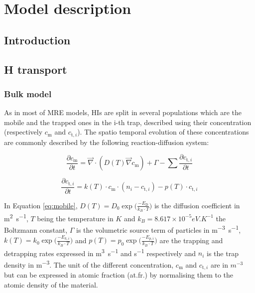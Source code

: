 \chapter{Model description}
\label{Chapter2} %
\section{Introduction}
\section{H transport} \label{description_H_transport_model}
\subsection{Bulk model}
As in most of MRE models, HIs are split in several populations which are the mobile and the trapped ones in the i-th trap, described using their concentration (respectively $c_\mathrm{m}$ and $c_{\mathrm{t},i}$).
The spatio temporal evolution of these concentrations are commonly described by the following reaction-diffusion system:

\begin{equation}
    \frac{\partial c_\mathrm{m}}{\partial t}=\vec{\nabla} \cdot\left(D(T) \vec{\nabla}c_\mathrm{m}\right)+\Gamma-\sum \frac{\partial c_{\mathrm{t}, i}}{\partial t}
    \label{eq:mobile}
\end{equation}

\begin{equation}
    \frac{\partial c_{\mathrm{t}, i}}{\partial t}=k(T) \cdot c_\mathrm{m} \cdot\left(n_{i}-c_{\mathrm{t}, i}\right)-p(T) \cdot c_{\mathrm{t}, i}
    \label{eq:trapped}
\end{equation}

In Equation \ref{eq:mobile}, ${D(T)=D_0 \exp\big(\frac{-E_\mathrm{D}}{k_B \cdot T}\big)}$ is the diffusion coefficient in \si{m^2.s^{-1}}, $T$ being the temperature in $\si{K}$ and ${k_B = 8.617 \times 10^{-5} \si{eV.K^{-1}}}$ the Boltzmann constant, $\Gamma$ is the volumetric source term of particles in \si{m^{-3}.s^{-1}}, $k(T)=k_0\exp{\big(\frac{-E_{k, i}}{k_B \cdot T}\big)}$ and $p(T)=p_0\exp{\big(\frac{-E_{p, i}}{k_B \cdot T}\big)}$ are the trapping and detrapping rates expressed in \si{m^3.s^{-1}} and \si{s^{-1}} respectively and $n_i$ is the trap density in \si{m^{-3}}.
The unit of the different concentration, $c_\mathrm{m}$ and $c_{\mathrm{t},i}$ are in $ \si{m^{-3}}$ but can be expressed in atomic fraction (at.fr.) by normalising them to the atomic density of the material.

